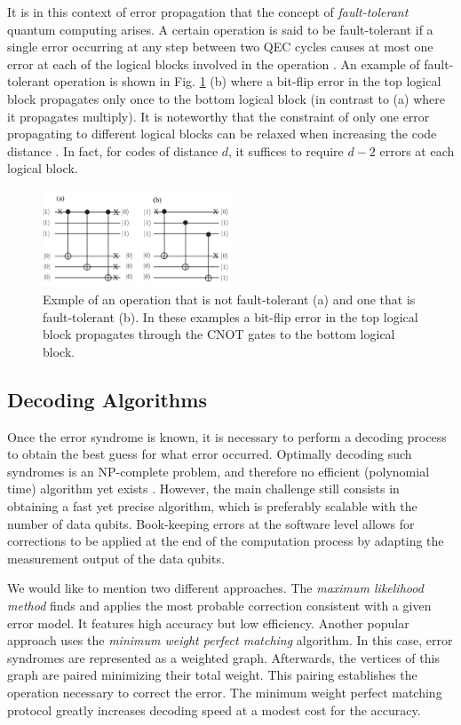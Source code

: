 It is in this context of error propagation that the concept of
\textit{fault-tolerant} quantum computing arises. A certain operation is said to
be fault-tolerant if a single error occurring at any step between two QEC cycles
causes at most one error at each of the logical blocks involved in the operation
\cite{Devitt_2013}. An example of fault-tolerant operation is shown in Fig.
\ref{fig:fault_tol} (b) where a bit-flip error in the top logical block
propagates only once to the bottom logical block (in contrast to (a) where it
propagates multiply). It is noteworthy that the constraint of only one
error propagating to different logical blocks can be relaxed when increasing the
code distance \cite{Devitt_2013}. In fact, for codes of distance $d$, it suffices
to require $d-2$ errors at each logical block.

\begin{figure}[htbp]
  \centering
  \includegraphics[width=0.5\textwidth]{images/fault_tolerance.pdf}
  \caption{Exmple of an operation that is not fault-tolerant (a) and one that is
    fault-tolerant (b). In these examples a bit-flip error in the top logical
    block propagates through the CNOT gates to the bottom logical block.}
  \label{fig:fault_tol}
\end{figure}

\subsection{Decoding Algorithms}
Once the error syndrome is known, it is necessary to perform a decoding process
to obtain the best guess for what error occurred. Optimally decoding such
syndromes is an NP-complete problem, and therefore no efficient (polynomial
time) algorithm yet exists \cite{Berlekamp}. However, the main challenge still
consists in obtaining a fast yet precise algorithm, which is preferably scalable
with the number of data qubits. Book-keeping errors at the
software level allows for corrections to be applied at the end of the
computation process by adapting the measurement output of the data qubits.

We would like to mention two different approaches. The \textit{maximum
  likelihood method} \cite{Varsamopoulos_2020} finds and applies the most
probable correction consistent with a given error model. It features high
accuracy but low efficiency. Another popular approach uses the \textit{minimum
  weight perfect matching} \cite{fowler2013minimum} algorithm. In this case,
error syndromes are represented as a weighted graph. Afterwards, the vertices of
this graph are paired minimizing their total weight. This pairing establishes
the operation necessary to correct the error. The minimum weight perfect
matching protocol greatly increases decoding speed at a modest cost for the
accuracy.

